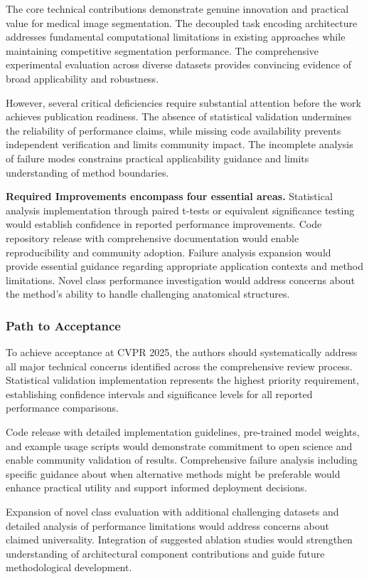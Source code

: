 The core technical contributions demonstrate genuine innovation and practical value for medical image segmentation. The decoupled task encoding architecture addresses fundamental computational limitations in existing approaches while maintaining competitive segmentation performance. The comprehensive experimental evaluation across diverse datasets provides convincing evidence of broad applicability and robustness.

However, several critical deficiencies require substantial attention before the work achieves publication readiness. The absence of statistical validation undermines the reliability of performance claims, while missing code availability prevents independent verification and limits community impact. The incomplete analysis of failure modes constrains practical applicability guidance and limits understanding of method boundaries.

\textbf{Required Improvements encompass four essential areas.} Statistical analysis implementation through paired t-tests or equivalent significance testing would establish confidence in reported performance improvements. Code repository release with comprehensive documentation would enable reproducibility and community adoption. Failure analysis expansion would provide essential guidance regarding appropriate application contexts and method limitations. Novel class performance investigation would address concerns about the method's ability to handle challenging anatomical structures.

\subsubsection{Path to Acceptance}
To achieve acceptance at CVPR 2025, the authors should systematically address all major technical concerns identified across the comprehensive review process. Statistical validation implementation represents the highest priority requirement, establishing confidence intervals and significance levels for all reported performance comparisons.

Code release with detailed implementation guidelines, pre-trained model weights, and example usage scripts would demonstrate commitment to open science and enable community validation of results. Comprehensive failure analysis including specific guidance about when alternative methods might be preferable would enhance practical utility and support informed deployment decisions.

Expansion of novel class evaluation with additional challenging datasets and detailed analysis of performance limitations would address concerns about claimed universality. Integration of suggested ablation studies would strengthen understanding of architectural component contributions and guide future methodological development.

